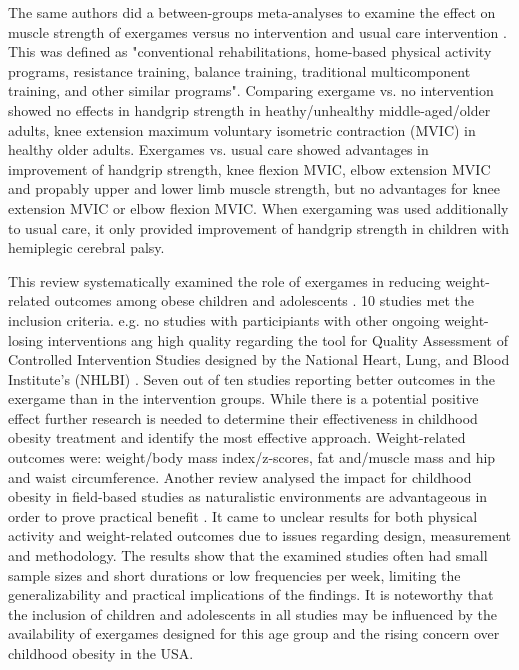 The same authors did a between-­groups meta-­analyses to examine the effect on muscle strength of exergames versus no intervention and usual care intervention \cite{viana2021effects}. This was defined as "conventional rehabilitations, home-­based physical activity programs, resistance training, balance training, traditional multicomponent training, and other similar programs".
Comparing exergame vs. no intervention showed no effects in handgrip strength in heathy/unhealthy middle-­aged/older adults, knee extension maximum voluntary isometric contraction (MVIC) in healthy older adults. Exergames vs. usual care showed advantages in improvement of handgrip strength, knee flexion MVIC, elbow extension MVIC and propably upper and lower limb muscle strength, but no advantages for knee extension MVIC or elbow flexion MVIC. When exergaming was used additionally to usual care, it only provided improvement of handgrip strength in children with hemiplegic cerebral palsy.

This review systematically examined the role of exergames in reducing weight-related outcomes among obese children and adolescents \cite{valeriani2021exergames}. 10 studies met the inclusion criteria. e.g. no studies with participiants with other ongoing weight-losing interventions ang high quality regarding the tool for Quality Assessment of Controlled Intervention Studies designed by the National Heart, Lung, and Blood Institute’s (NHLBI) \cite{link_studyquality}. Seven out of ten studies reporting better outcomes in the exergame than in the intervention groups. While there is a potential positive effect further research is needed to determine their effectiveness in childhood obesity treatment and identify the most effective approach.  Weight-related outcomes were: weight/body mass index/z-scores, fat and/muscle mass and hip and waist circumference. 
Another review analysed the impact for childhood obesity in field-based studies \cite{gao2014field} as naturalistic environments are advantageous in order to prove practical benefit \cite{baranowski2012impact}. It came to unclear results for both physical activity and weight-related outcomes due to issues regarding design, measurement and methodology. The results show that the examined studies often had small sample sizes and short durations or low frequencies per week, limiting the generalizability and practical implications of the findings. It is noteworthy that the inclusion of children and adolescents in all studies may be influenced by the availability of exergames designed for this age group and the rising concern over childhood obesity in the USA.

